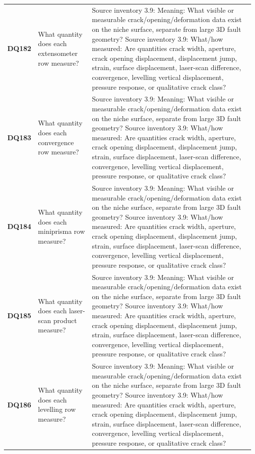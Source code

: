 \begin{longtable}{@{}L{0.09\textwidth} L{0.31\textwidth} L{0.52\textwidth}@{}}
\addlinespace[0.18em]
\textbf{DQ182} & What quantity does each extensometer row measure? & Source inventory 3.9: Meaning: What visible or measurable crack/opening/deformation data exist on the niche surface, separate from large 3D fault geometry? Source inventory 3.9: What/how measured: Are quantities crack width, aperture, crack opening displacement, displacement jump, strain, surface displacement, laser-scan difference, convergence, levelling vertical displacement, pressure response, or qualitative crack class?\\
\addlinespace[0.18em]
\textbf{DQ183} & What quantity does each convergence row measure? & Source inventory 3.9: Meaning: What visible or measurable crack/opening/deformation data exist on the niche surface, separate from large 3D fault geometry? Source inventory 3.9: What/how measured: Are quantities crack width, aperture, crack opening displacement, displacement jump, strain, surface displacement, laser-scan difference, convergence, levelling vertical displacement, pressure response, or qualitative crack class?\\
\addlinespace[0.18em]
\textbf{DQ184} & What quantity does each miniprisma row measure? & Source inventory 3.9: Meaning: What visible or measurable crack/opening/deformation data exist on the niche surface, separate from large 3D fault geometry? Source inventory 3.9: What/how measured: Are quantities crack width, aperture, crack opening displacement, displacement jump, strain, surface displacement, laser-scan difference, convergence, levelling vertical displacement, pressure response, or qualitative crack class?\\
\addlinespace[0.18em]
\textbf{DQ185} & What quantity does each laser-scan product measure? & Source inventory 3.9: Meaning: What visible or measurable crack/opening/deformation data exist on the niche surface, separate from large 3D fault geometry? Source inventory 3.9: What/how measured: Are quantities crack width, aperture, crack opening displacement, displacement jump, strain, surface displacement, laser-scan difference, convergence, levelling vertical displacement, pressure response, or qualitative crack class?\\
\addlinespace[0.18em]
\textbf{DQ186} & What quantity does each levelling row measure? & Source inventory 3.9: Meaning: What visible or measurable crack/opening/deformation data exist on the niche surface, separate from large 3D fault geometry? Source inventory 3.9: What/how measured: Are quantities crack width, aperture, crack opening displacement, displacement jump, strain, surface displacement, laser-scan difference, convergence, levelling vertical displacement, pressure response, or qualitative crack class?\\

\end{longtable}
